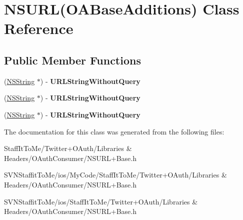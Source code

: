 \hypertarget{interface_n_s_u_r_l_07_o_a_base_additions_08}{
\section{\-N\-S\-U\-R\-L(\-O\-A\-Base\-Additions) \-Class \-Reference}
\label{interface_n_s_u_r_l_07_o_a_base_additions_08}
}
\subsection*{\-Public \-Member \-Functions}
\begin{DoxyCompactItemize}
\item 
\hypertarget{interface_n_s_u_r_l_07_o_a_base_additions_08_abd2477854cbcb95f65ea9b1deabcd2fe}{
(\hyperlink{class_n_s_string}{\-N\-S\-String} $\ast$) -\/ {\bfseries \-U\-R\-L\-String\-Without\-Query}}
\label{interface_n_s_u_r_l_07_o_a_base_additions_08_abd2477854cbcb95f65ea9b1deabcd2fe}

\item 
\hypertarget{interface_n_s_u_r_l_07_o_a_base_additions_08_abd2477854cbcb95f65ea9b1deabcd2fe}{
(\hyperlink{class_n_s_string}{\-N\-S\-String} $\ast$) -\/ {\bfseries \-U\-R\-L\-String\-Without\-Query}}
\label{interface_n_s_u_r_l_07_o_a_base_additions_08_abd2477854cbcb95f65ea9b1deabcd2fe}

\item 
\hypertarget{interface_n_s_u_r_l_07_o_a_base_additions_08_abd2477854cbcb95f65ea9b1deabcd2fe}{
(\hyperlink{class_n_s_string}{\-N\-S\-String} $\ast$) -\/ {\bfseries \-U\-R\-L\-String\-Without\-Query}}
\label{interface_n_s_u_r_l_07_o_a_base_additions_08_abd2477854cbcb95f65ea9b1deabcd2fe}

\end{DoxyCompactItemize}


\-The documentation for this class was generated from the following files\-:\begin{DoxyCompactItemize}
\item 
\-Staff\-It\-To\-Me/\-Twitter+\-O\-Auth/\-Libraries \& Headers/\-O\-Auth\-Consumer/\-N\-S\-U\-R\-L+\-Base.\-h\item 
\-S\-V\-N\-Staffit\-To\-Me/ios/\-My\-Code/\-Staff\-It\-To\-Me/\-Twitter+\-O\-Auth/\-Libraries \& Headers/\-O\-Auth\-Consumer/\-N\-S\-U\-R\-L+\-Base.\-h\item 
\-S\-V\-N\-Staffit\-To\-Me/ios/\-Staff\-It\-To\-Me/\-Twitter+\-O\-Auth/\-Libraries \& Headers/\-O\-Auth\-Consumer/\-N\-S\-U\-R\-L+\-Base.\-h\end{DoxyCompactItemize}
